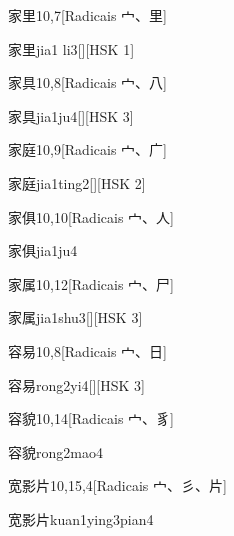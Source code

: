 \begin{entry}{家里}{10,7}[Radicais ⼧、⾥]
  \begin{phonetics}{家里}{jia1 li3}[][HSK 1]
  \end{phonetics}
\end{entry}

\begin{entry}{家具}{10,8}[Radicais ⼧、⼋]
  \begin{phonetics}{家具}{jia1ju4}[][HSK 3]
  \end{phonetics}
\end{entry}

\begin{entry}{家庭}{10,9}[Radicais ⼧、⼴]
  \begin{phonetics}{家庭}{jia1ting2}[][HSK 2]
  \end{phonetics}
\end{entry}

\begin{entry}{家俱}{10,10}[Radicais ⼧、⼈]
  \begin{phonetics}{家俱}{jia1ju4}
  \end{phonetics}
\end{entry}

\begin{entry}{家属}{10,12}[Radicais ⼧、⼫]
  \begin{phonetics}{家属}{jia1shu3}[][HSK 3]
  \end{phonetics}
\end{entry}

\begin{entry}{容易}{10,8}[Radicais ⼧、⽇]
  \begin{phonetics}{容易}{rong2yi4}[][HSK 3]
  \end{phonetics}
\end{entry}

\begin{entry}{容貌}{10,14}[Radicais ⼧、⾘]
  \begin{phonetics}{容貌}{rong2mao4}
  \end{phonetics}
\end{entry}

\begin{entry}{宽影片}{10,15,4}[Radicais ⼧、⼺、⽚]
  \begin{phonetics}{宽影片}{kuan1ying3pian4}
  \end{phonetics}
\end{entry}

